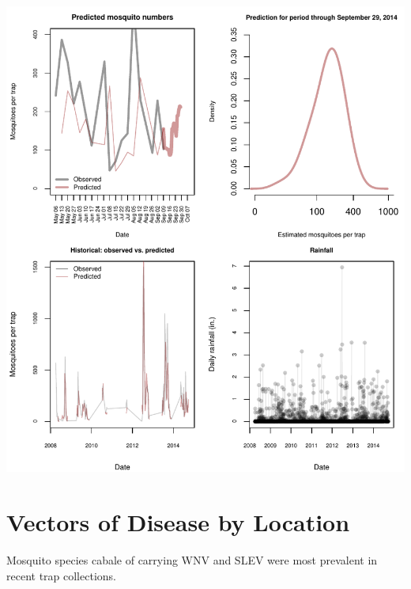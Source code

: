\documentclass{article}
\begin{document}
\includegraphics{mosquitoReport-006}


\newpage

\section*{Vectors of Disease by Location}
\hrulefill
\vspace{5mm}

Mosquito species cabale of carrying WNV and SLEV were most prevalent in recent trap collections.
\end{document}
